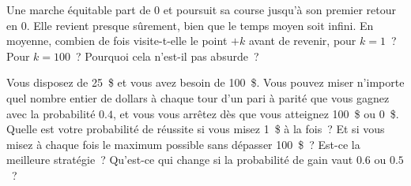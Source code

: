 \begin{question}\label{iq:iv1:random-walks-and-martingales:24}
Une marche équitable part de 0 et poursuit sa course jusqu'à son premier retour en 0. Elle revient presque sûrement, bien que le temps moyen soit infini. En moyenne, combien de fois visite-t-elle le point $+k$ avant de revenir, pour $k = 1$~? Pour $k = 100$~? Pourquoi cela n'est-il pas absurde~?
\end{question}

\begin{question}\label{iq:iv1:random-walks-and-martingales:25}
Vous disposez de 25~\$ et vous avez besoin de 100~\$. Vous pouvez miser n'importe quel nombre entier de dollars à chaque tour d'un pari à parité que vous gagnez avec la probabilité $0.4$, et vous vous arrêtez dès que vous atteignez 100~\$ ou 0~\$. Quelle est votre probabilité de réussite si vous misez 1~\$ à la fois~? Et si vous misez à chaque fois le maximum possible sans dépasser 100~\$~? Est-ce la meilleure stratégie~? Qu'est-ce qui change si la probabilité de gain vaut $0.6$ ou $0.5$~?
\end{question}
